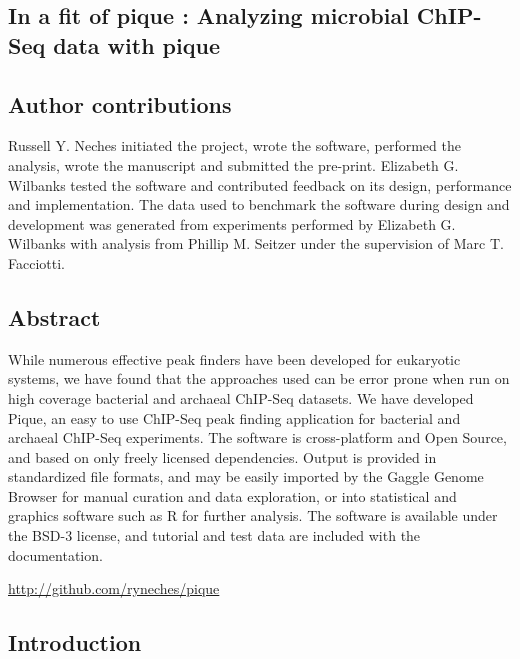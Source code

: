 \begin{refsection}

\chapter{In a fit of pique : Analyzing microbial ChIP-Seq data with pique}


\section{Author contributions}

Russell Y. Neches initiated the project, wrote the software, performed
the analysis, wrote the manuscript and submitted the pre-print.
Elizabeth G. Wilbanks tested the software and contributed feedback on
its design, performance and implementation. The data used to benchmark
the software during design and development was generated from
experiments performed by Elizabeth G. Wilbanks with analysis from
Phillip M. Seitzer under the supervision of Marc T. Facciotti.

\section{Abstract}

While numerous effective peak finders have been developed
for eukaryotic systems, we have found that the approaches used can be
error prone when run on high coverage bacterial and archaeal ChIP-Seq
datasets. We have developed Pique, an easy to use ChIP-Seq peak
finding application for bacterial and archaeal ChIP-Seq experiments.
The software is cross-platform and Open Source, and based on only
freely licensed dependencies. Output is provided in standardized file
formats, and may be easily imported by the Gaggle Genome Browser
\cite{gaggle_browser} for manual curation and data exploration, or
into statistical and graphics software such as R \cite{R} for further
analysis. The software is available under the BSD-3 license, and tutorial
and test data are included with the documentation.

\url{http://github.com/ryneches/pique}

\section{Introduction}


\end{refsection}
